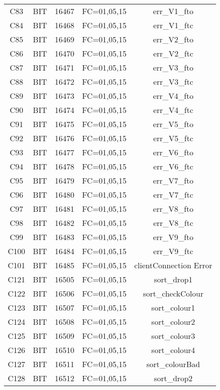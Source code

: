 \begin{center}
\begin{longtable}[c]{ |c|c|c|c|c| }
        C83	&	BIT	&	16467	&	FC=01,05,15	&	err\_V1\_fto\\
        C84	&	BIT	&	16468	&	FC=01,05,15	&	err\_V1\_ftc\\
        C85	&	BIT	&	16469	&	FC=01,05,15	&	err\_V2\_fto\\
        C86	&	BIT	&	16470	&	FC=01,05,15	&	err\_V2\_ftc\\
        C87	&	BIT	&	16471	&	FC=01,05,15	&	err\_V3\_fto\\
        C88	&	BIT	&	16472	&	FC=01,05,15	&	err\_V3\_ftc\\
        C89	&	BIT	&	16473	&	FC=01,05,15	&	err\_V4\_fto\\
        C90	&	BIT	&	16474	&	FC=01,05,15	&	err\_V4\_ftc\\
        C91	&	BIT	&	16475	&	FC=01,05,15	&	err\_V5\_fto\\
        C92	&	BIT	&	16476	&	FC=01,05,15	&	err\_V5\_ftc\\
        C93	&	BIT	&	16477	&	FC=01,05,15	&	err\_V6\_fto\\
        C94	&	BIT	&	16478	&	FC=01,05,15	&	err\_V6\_ftc\\
        C95	&	BIT	&	16479	&	FC=01,05,15	&	err\_V7\_fto\\
        C96	&	BIT	&	16480	&	FC=01,05,15	&	err\_V7\_ftc\\
        C97	&	BIT	&	16481	&	FC=01,05,15	&	err\_V8\_fto\\
        C98	&	BIT	&	16482	&	FC=01,05,15	&	err\_V8\_ftc\\
        C99	&	BIT	&	16483	&	FC=01,05,15	&	err\_V9\_fto\\
        C100	&	BIT	&	16484	&	FC=01,05,15	&	err\_V9\_ftc\\
        C101	&	BIT	&	16485	&	FC=01,05,15	&	clientConnection Error\\
        C121	&	BIT	&	16505	&	FC=01,05,15	&	sort\_drop1\\
        C122	&	BIT	&	16506	&	FC=01,05,15	&	sort\_checkColour\\
        C123	&	BIT	&	16507	&	FC=01,05,15	&	sort\_colour1\\
        C124	&	BIT	&	16508	&	FC=01,05,15	&	sort\_colour2\\
        C125	&	BIT	&	16509	&	FC=01,05,15	&	sort\_colour3\\
        C126	&	BIT	&	16510	&	FC=01,05,15	&	sort\_colour4\\
        C127	&	BIT	&	16511	&	FC=01,05,15	&	sort\_colourBad\\
        C128	&	BIT	&	16512	&	FC=01,05,15	&	sort\_drop2\\

\end{longtable}
\end{center}
